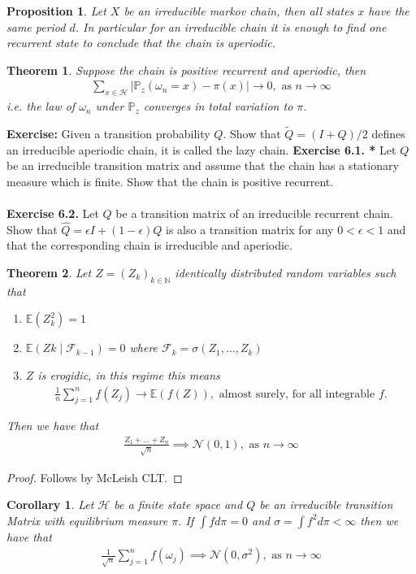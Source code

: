 \documentclass[11pt,a4paper, final]{article}
\newtheorem{thm}{Theorem}[section]
\newtheorem{prop}{Proposition}[section]
\newtheorem{cor}{Corollary}[section]
\theoremstyle{definition}
\begin{document}
\begin{prop} Let $X$ be an irreducible markov chain, then all states $x$ have the same period $d$. In particular for an irreducible chain it is enough to find one recurrent state to conclude that the chain is aperiodic. 
\end{prop}
\begin{thm} Suppose the chain is positive recurrent and aperiodic, then 
\begin{align*}
\sum_{x \in \mathcal{H}} | \mathbb{P}_z( \omega_n =x) - \pi (x) | \to 0, \text{ as } n \to \infty 
\end{align*}
i.e. the law of $\omega_n$ under $\mathbb{P}_z$ converges in total variation to $\pi$. 
\end{thm}
\textbf{Exercise:} Given a transition probability $Q$. Show that $\tilde{Q} = (I + Q)/2$ defines an irreducible aperiodic chain, it is called the lazy chain. 
\newpage
\noindent \textbf{Exercise 6.1. *} Let $Q$ be an irreducible transition matrix and assume that the chain has a stationary measure which is finite. Show that the chain is positive recurrent. 
\\\\
\textbf{Exercise 6.2.} Let $Q$ be a transition matrix of an irreducible recurrent chain. Show that $\widehat{Q}= \epsilon I + (1- \epsilon) Q$ is also a transition matrix for any $0 < \epsilon < 1$ and that the corresponding chain is irreducible and aperiodic. 
\begin{thm} Let $Z=(Z_k)_{k \in \mathbb{N}}$ identically distributed random variables such that
\begin{enumerate}
\item $\mathbb{E}(Z_k^2)=1$ 
\item $\mathbb{E}(Zk \mid \mathcal{F}_{k-1}) = 0$ where $\mathcal{F}_k = \sigma (Z_1, \dots , Z_k)$
\item $Z$ is erogidic, in this regime this means 
\begin{align*}
\frac{1}{n} \sum_{j=1}^n f(Z_j) \to \mathbb{E}(f(Z)), \text{ almost surely, for all integrable $f$}.
\end{align*}
\end{enumerate}
Then we have that
\begin{align*}
\frac{Z_1 + \dots + Z_n}{\sqrt{n}} \implies \mathcal{N}(0,1), \text{ as } n  \to \infty 
\end{align*}
\end{thm}
\begin{proof}
Follows by McLeish CLT.
\end{proof}
\begin{cor} Let $\mathcal{H}$ be a finite state space and $Q$ be an irreducible transition Matrix with equilibrium measure $\pi$. If $\int f d  \pi =0$ and $\sigma = \int f^2 d \pi <  \infty$ then we have that 
\begin{align*}
\frac{1}{\sqrt{n}} \sum_{j=1}^n f ( \omega_j) \implies \mathcal{N}(0, \sigma^2), \text{ as } n  \to \infty 
\end{align*}
\end{cor}
\newpage
\end{document}
